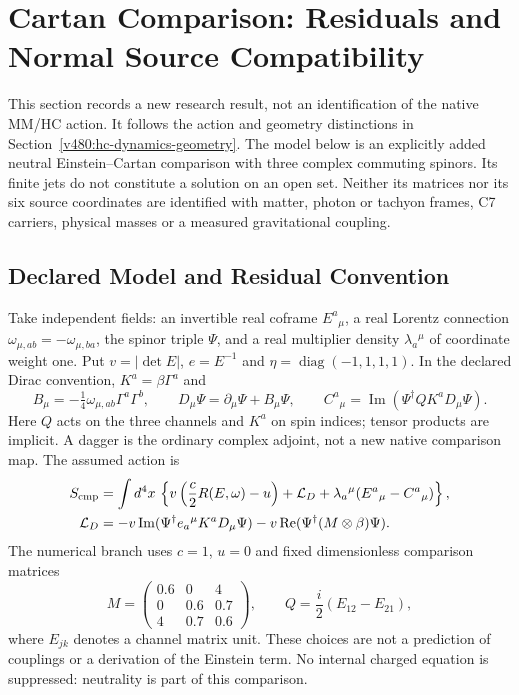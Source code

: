 \section{Cartan Comparison: Residuals and Normal Source Compatibility}
\label{v490:cartan-source}

This section records a new research result, not an identification of the
native MM/HC action. It follows the action and geometry distinctions in
Section~\ref{v480:hc-dynamics-geometry}. The model below is an explicitly
added neutral Einstein--Cartan comparison with three complex commuting
spinors. Its finite jets do not constitute a solution on an open set.
Neither its matrices nor its six source coordinates are identified with
matter, photon or tachyon frames, C7 carriers, physical masses or a
measured gravitational coupling.

\subsection{Declared Model and Residual Convention}
\label{v490:cartan-model}

Take independent fields: an invertible real coframe $E^a{}_{\mu}$, a real
Lorentz connection $\omega_{\mu,ab}=-\omega_{\mu,ba}$, the spinor triple
$\Psi$, and a real multiplier density $\lambda_a{}^\mu$ of coordinate
weight one. Put $v=|\det E|$, $e=E^{-1}$ and
$\eta=\operatorname{diag}(-1,1,1,1)$. In the declared Dirac convention,
$K^a=\beta\Gamma^a$ and
\[
 B_\mu=-\tfrac14\omega_{\mu,ab}\Gamma^a\Gamma^b,
 \qquad D_\mu\Psi=\partial_\mu\Psi+B_\mu\Psi,
 \qquad C^a{}_{\mu}=\operatorname{Im}
       (\Psi^\dagger QK^aD_\mu\Psi).
\]
Here $Q$ acts on the three channels and $K^a$ on spin indices; tensor
products are implicit. A dagger is the ordinary complex adjoint, not a
new native comparison map. The assumed action is
\begin{align}
 S_{\rm cmp}&=\int d^4x\,
 \left\{v\left(\frac c2 R(E,\omega)-u\right)
             +\mathcal L_D+\lambda_a{}^\mu(E^a{}_{\mu}-C^a{}_{\mu})\right\},
 \label{v490:cartan-action}\\
 \mathcal L_D&=-v\operatorname{Im}
  (\Psi^\dagger e_a{}^\mu K^aD_\mu\Psi)
  -v\operatorname{Re}(\Psi^\dagger(M\otimes\beta)\Psi).
 \nonumber
\end{align}
The numerical branch uses $c=1$, $u=0$ and fixed dimensionless comparison
matrices
\[
 M=\begin{pmatrix}0.6&0&4\\0&0.6&0.7\\4&0.7&0.6\end{pmatrix},
 \qquad Q=\frac i2(E_{12}-E_{21}),
\]
where $E_{jk}$ denotes a channel matrix unit. These choices are not a
prediction of couplings or a derivation of the Einstein term. No internal
charged equation is suppressed: neutrality is part of this comparison.

